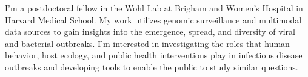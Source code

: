 
\begin{cvparagraph}

    I'm a postdoctoral fellow in the Wohl Lab at Brigham and Women's Hospital in Harvard Medical School.
    My work utilizes genomic surveillance and multimodal data sources to gain insights into the emergence, spread, and diversity of viral and bacterial outbreaks.
    I'm interested in investigating the roles that human behavior, host ecology, and public health interventions play in infectious disease outbreaks and developing tools to enable the
    public to study similar questions. 
\end{cvparagraph}
